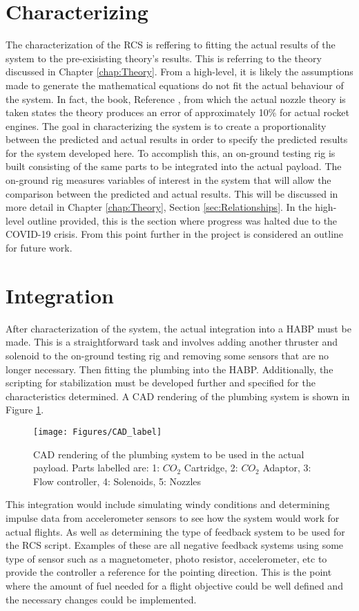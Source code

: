\section{Characterizing}
The characterization of the RCS is reffering to fitting the actual results of the system to the pre-exisisting theory's results. This is referring to the theory discussed in Chapter \ref{chap:Theory}. From a high-level, it is likely the assumptions made to generate the mathematical equations do not fit the actual behaviour of the system. In fact, the book, Reference \cite{langton}, from which the actual nozzle theory is taken states the theory produces an error of approximately 10\% for actual rocket engines. The goal in characterizing the system is to create a proportionality between the predicted and actual results in order to specify the predicted results for the system developed here. To accomplish this, an on-ground testing rig is built consisting of the same parts to be integrated into the actual payload. The on-ground rig measures variables of interest in the system that will allow the comparison between the predicted and actual results. This will be discussed in more detail in Chapter \ref{chap:Theory}, Section \ref{sec:Relationships}. In the high-level outline provided, this is the section where progress was halted due to the COVID-19 crisis. From this point further in the project is considered an outline for future work.
\section{Integration}
After characterization of the system, the actual integration into a HABP must be made. This is a straightforward task and involves adding another thruster and solenoid to the on-ground testing rig and removing some sensors that are no longer necessary. Then fitting the plumbing into the HABP. Additionally, the scripting for stabilization must be developed further and specified for the characteristics determined. A CAD rendering of the plumbing system is shown in Figure \ref{fig:CAD}.
\begin{figure}[h!]
\centering
\texttt{[image: Figures/CAD\_label]}
\caption{CAD rendering of the plumbing system to be used in the actual payload. Parts labelled are: 1: $CO_2$ Cartridge, 2: $CO_2$ Adaptor, 3: Flow controller, 4: Solenoids, 5: Nozzles}
\label{fig:CAD}
\end{figure}
This integration would include simulating windy conditions and determining impulse data from accelerometer sensors to see how the system would work for actual flights. As well as determining the type of feedback system to be used for the RCS script. Examples of these are all negative feedback systems using some type of sensor such as a magnetometer, photo resistor, accelerometer, etc to provide the controller a reference for the pointing direction. This is the point where the amount of fuel needed for a flight objective could be well defined and the necessary changes could be implemented.
